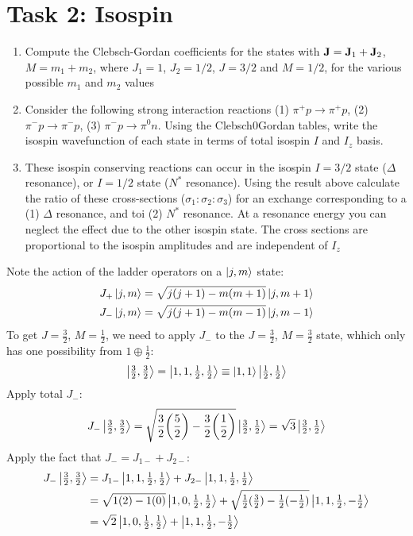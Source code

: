 \documentclass[12pt]{article}
\begin{document}
\section*{Task 2: Isospin}
\begin{problem}
  \begin{enumerate}
  \item Compute the Clebsch-Gordan coefficients for the states with $\vb{J}=\vb{J}_1+\vb{J}_2$, $M=m_1+m_2$, where $J_1=1$, $J_2=1/2$, $J=3/2$ and $M=1/2$, for the various possible $m_1$ and $m_2$ values
  \item Consider the following strong interaction reactions (1) $\pi^+p\to\pi^+p$, (2) $\pi^-p\to\pi^-p$, (3) $\pi^-p\to\pi^0n$. Using the Clebsch0Gordan tables, write the isospin wavefunction of each state in terms of total isospin $I$ and $I_z$ basis.
  \item These isospin conserving reactions can occur in the isospin $I=3/2$ state ($\Delta$ resonance), or $I=1/2$ state ($N^*$ resonance). Using the result above calculate the ratio of these cross-sections ($\sigma_1:\sigma_2:\sigma_3$) for an exchange corresponding to a (1) $\Delta$ resonance, and toi (2) $N^*$ resonance. At a resonance energy you can neglect the effect due to the other isospin state. The cross sections are proportional to the isospin amplitudes and are independent of $I_z$
  \end{enumerate}
\end{problem}
Note the action of the ladder operators on a $\ket{j,m}$ state:
\begin{align*}
  J_+\ket{j,m}&=\sqrt{j(j+1)-m(m+1)}\ket{j,m+1}\\
  J_-\ket{j,m}&=\sqrt{j(j+1)-m(m-1)}\ket{j,m-1}
\end{align*}
To get $J=\frac32$, $M=\frac12$, we need to apply $J_-$ to the $J=\frac32$, $M=\frac32$ state, whhich only has one possibility from $1\oplus\frac12$:
\begin{align*}
  \ket{\tfrac32,\tfrac32}=\ket{1,1,\tfrac12,\tfrac12}
  \equiv\ket{1,1}\ket{\tfrac12,\tfrac12}
\end{align*}
Apply total $J_-$:
\begin{align*}
  J_-\ket{\tfrac32,\tfrac32}=\sqrt{\frac32\qty(\frac52)-\frac32\qty(\frac12)}
  \ket{\tfrac32,\tfrac12}=\sqrt{3}\ket{\tfrac32,\tfrac12}
\end{align*}
Apply the fact that $J_-=J_{1-}+J_{2-}$:
\begin{align*}
  J_-\ket{\tfrac32,\tfrac32}&=
  J_{1-}\ket{1,1,\tfrac12,\tfrac12}+J_{2-}\ket{1,1,\tfrac12,\tfrac12}\\
  &=\sqrt{1(2)-1(0)}\ket{1,0,\tfrac12,\tfrac12}+
  \sqrt{\tfrac12(\tfrac32)-\tfrac12(-\tfrac12)}\ket{1,1,\tfrac12,-\tfrac12}\\
  &=\sqrt{2}\ket{1,0,\tfrac12,\tfrac12}+\ket{1,1,\tfrac12,-\tfrac12}
\end{align*}
\end{document}
